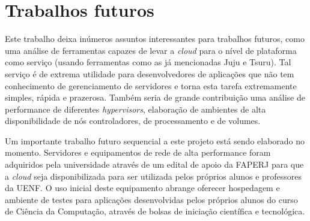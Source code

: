 \section{Trabalhos futuros}
\label{sec:trabalhos_futuros}

Este trabalho deixa inúmeros assuntos interessantes para trabalhos futuros, como
uma análise de ferramentas capazes de levar a \emph{cloud} para o nível de
plataforma como serviço (usando ferramentas como as já mencionadas Juju e Tsuru).
Tal serviço é de extrema utilidade para desenvolvedores de aplicações que não
tem conhecimento de gerenciamento de servidores e torna esta tarefa extremamente
simples, rápida e prazerosa. Também seria de grande contribuição uma análise
de performance de diferentes \emph{hypervisors}, elaboração de ambientes de
alta disponibilidade de nós controladores, de processamento e de volumes.

Um importante trabalho futuro sequencial a este projeto está sendo elaborado no
momento. Servidores e equipamentos de rede de alta performance foram adquiridos
pela universidade através de um edital de apoio da FAPERJ para que a \emph{cloud}
seja disponibilizada para ser utilizada pelos próprios alunos e professores da
UENF. O uso inicial deste equipamento abrange oferecer hospedagem e ambiente
de testes para aplicações desenvolvidas pelos próprios alunos do curso de Ciência
da Computação, através de bolsas de iniciação científica e tecnológica.
